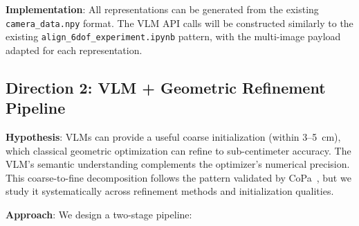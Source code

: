 \documentclass[11pt,a4paper]{article}
\begin{document}
\textbf{Implementation}: All representations can be generated from the existing \texttt{camera\_data.npy} format. The VLM API calls will be constructed similarly to the existing \texttt{align\_6dof\_experiment.ipynb} pattern, with the multi-image payload adapted for each representation.

\subsection{Direction 2: VLM + Geometric Refinement Pipeline}

\textbf{Hypothesis}: VLMs can provide a useful coarse initialization (within 3--5~cm), which classical geometric optimization can refine to sub-centimeter accuracy. The VLM's semantic understanding complements the optimizer's numerical precision. This coarse-to-fine decomposition follows the pattern validated by CoPa~\cite{huang2024copa}, but we study it systematically across refinement methods and initialization qualities.

\textbf{Approach}: We design a two-stage pipeline:
\end{document}
